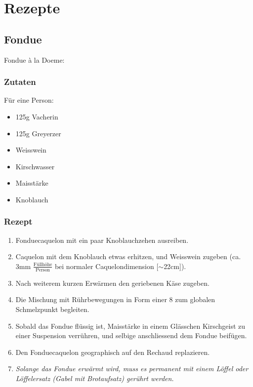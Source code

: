\documentclass[oneside,12pt,a4paper]{scrartcl}
\begin{document}
\section{Rezepte}
\subsection{Fondue}
Fondue à la Doeme:

\subsubsection{Zutaten}
Für eine Person:
\begin{itemize}
\item 125g Vacherin
\item 125g Greyerzer
\item Weisswein
\item Kirschwasser
\item Maisstärke
\item Knoblauch
\end{itemize}
\subsubsection{Rezept}

\begin{enumerate}
\item Fonduecaquelon mit ein paar Knoblauchzehen ausreiben.
\item Caquelon mit dem Knoblauch etwas erhitzen, und Weisswein zugeben (ca. 3mm $\frac {\mbox{Füllhöhe}} {\mbox{Person}}$ bei normaler Caquelondimension [$\sim$22cm]).
\item Nach weiterem kurzen Erwärmen den geriebenen Käse zugeben.
\item Die Mischung mit Rührbewegungen in Form einer 8 zum globalen Schmelzpunkt begleiten.
\item Sobald das Fondue flüssig ist, Maisstärke in einem Glässchen Kirschgeist zu einer Suspension verrühren, und selbige anschliessend dem Fondue beifügen.
\item Den Fonduecaquelon geographisch auf den Rechaud replazieren.
\item \emph{Solange das Fondue erwärmt wird, muss es permanent mit einem Löffel oder Löffelersatz (Gabel mit Brotaufsatz) gerührt werden.} 
\end{enumerate}
\end{document}

